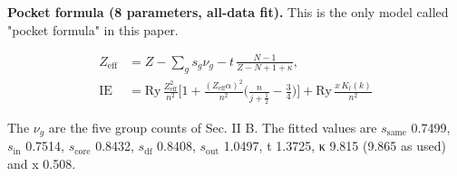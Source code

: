 \documentclass[aps,pra,preprint,notitlepage,superscriptaddress,amsmath,amssymb]{revtex4-2}
\begin{document}
\textbf{Pocket formula (8 parameters, all-data fit).} This is the only model called "pocket formula" in this paper.


\begin{equation}
\begin{aligned}
Z_\mathrm{eff} &= Z - \sum_g s_g\nu_g - t\,\frac{N-1}{Z-N+1+\kappa},\\
\mathrm{IE}&=\mathrm{Ry}\,\frac{Z_\mathrm{eff}^2}{n^2}\Big[1+\frac{(Z_\mathrm{eff}\alpha)^2}{n^2}\Big(\frac{n}{j+\tfrac12}-\frac34\Big)\Big]+\mathrm{Ry}\,\frac{x\,K_l(k)}{n^2}
\end{aligned}
\end{equation}

The $ν_{g}$ are the five group counts of Sec. II B. The fitted values are $s_{\mathrm{same}}$ 0.7499, $s_{\mathrm{in}}$ 0.7514, $s_{\mathrm{core}}$ 0.8432, $s_{\mathrm{df}}$ 0.8408, $s_{\mathrm{out}}$ 1.0497, t 1.3725, κ 9.815 (9.865 as used) and x 0.508.
\end{document}
